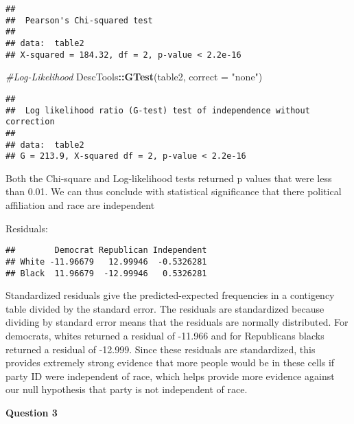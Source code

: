 \documentclass[
]{article}
\newenvironment{Shaded}{\begin{snugshade}}{\end{snugshade}}
\newcommand{\CommentTok}[1]{\textcolor[rgb]{0.56,0.35,0.01}{\textit{#1}}}
\newcommand{\DataTypeTok}[1]{\textcolor[rgb]{0.13,0.29,0.53}{#1}}
\newcommand{\KeywordTok}[1]{\textcolor[rgb]{0.13,0.29,0.53}{\textbf{#1}}}
\newcommand{\NormalTok}[1]{#1}
\newcommand{\OperatorTok}[1]{\textcolor[rgb]{0.81,0.36,0.00}{\textbf{#1}}}
\newcommand{\StringTok}[1]{\textcolor[rgb]{0.31,0.60,0.02}{#1}}
\begin{document}
\begin{verbatim}
## 
##  Pearson's Chi-squared test
## 
## data:  table2
## X-squared = 184.32, df = 2, p-value < 2.2e-16
\end{verbatim}

\begin{Shaded}
\begin{Highlighting}[]
\CommentTok{#Log-Likelihood}
\NormalTok{DescTools}\OperatorTok{::}\KeywordTok{GTest}\NormalTok{(table2,}
                 \DataTypeTok{correct =} \StringTok{"none"}\NormalTok{)}
\end{Highlighting}
\end{Shaded}

\begin{verbatim}
## 
##  Log likelihood ratio (G-test) test of independence without correction
## 
## data:  table2
## G = 213.9, X-squared df = 2, p-value < 2.2e-16
\end{verbatim}

Both the Chi-square and Log-likelihood tests returned p values that were
less than 0.01. We can thus conclude with statistical significance that
there political affiliation and race are independent

Residuals:

\begin{Shaded}
\end{Shaded}

\begin{verbatim}
##        Democrat Republican Independent
## White -11.96679   12.99946  -0.5326281
## Black  11.96679  -12.99946   0.5326281
\end{verbatim}

Standardized residuals give the predicted-expected frequencies in a
contigency table divided by the standard error. The residuals are
standardized because dividing by standard error means that the residuals
are normally distributed. For democrats, whites returned a residual of
-11.966 and for Republicans blacks returned a residual of -12.999. Since
these residuals are standardized, this provides extremely strong
evidence that more people would be in these cells if party ID were
independent of race, which helps provide more evidence against our null
hypothesis that party is not independent of race.

\textbf{Question 3}
\end{document}
